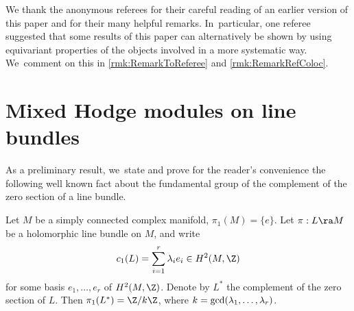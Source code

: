 We thank the anonymous referees for their careful reading of an earlier version of this paper and for their many helpful remarks. In~particular, one referee suggested that some results of this paper can alternatively be shown by using equivariant properties of the objects involved in a more systematic way. We~comment on this in \cref{rmk:RemarkToReferee} and \cref{rmk:RemarkRefColoc}.

\section{Mixed Hodge modules on line bundles} \label{sec:OBeta}

As a preliminary result, we~state and prove for the reader's convenience the following well known fact about the fundamental group of the complement of the zero section of a line bundle.

\begin{prop}\label{prop:PiEinsLStern}
Let $M$ be a simply connected complex manifold, \ie \hbox{$\pi_1(M)\!=\! \{e\}$}. Let $ \pi: L \ra M$ be a holomorphic line bundle on $M$, and write
\[
c_1(L)=\sum_{i=1}^r \lambda_i e_i \in H^2(M,\Z)
\]
for some basis $e_1,\ldots,e_r$ of $H^2(M,\Z)$.
Denote by $L^*$ the complement of the zero section of $L$. Then $\pi_1(L^*)=\Z/k \Z$, where $k=\textup{gcd}(\lambda_1,\ldots,\lambda_r)$.
\end{prop}

